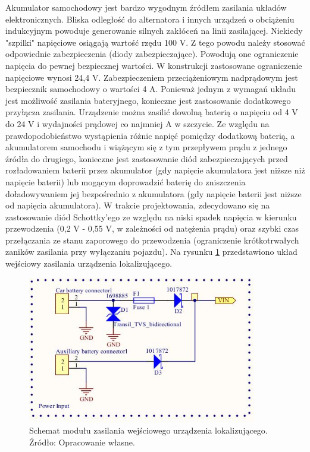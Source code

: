 Akumulator samochodowy jest bardzo wygodnym źródłem zasilania układów elektronicznych. Bliska odległość do alternatora i innych urządzeń o obciążeniu indukcyjnym powoduje generowanie silnych zakłóceń na linii zasilającej. Niekiedy "szpilki" napięciowe osiągają wartość rzędu 100 V. Z tego powodu należy stosować odpowiednie zabezpieczenia (diody zabezpieczające). Powodują one ograniczenie  napięcia do pewnej bezpiecznej wartości. W konstrukcji zastosowane ograniczenie napięciowe wynosi 24,4 V. Zabezpieczeniem przeciążeniowym nadprądowym jest bezpiecznik samochodowy o wartości 4 A. 
Ponieważ jednym z wymagań układu jest możliwość zasilania bateryjnego, konieczne jest zastosowanie dodatkowego przyłącza zasilania. Urządzenie można zasilić dowolną baterią o napięciu od 4 V do 24 V i wydajności prądowej co najmniej  A w szczycie. Ze względu na prawdopodobieństwo wystąpienia różnic napięć pomiędzy dodatkową baterią, a akumulatorem samochodu i wiążącym się z tym przepływem prądu z jednego źródła do drugiego, konieczne jest zastosowanie diód zabezpieczających przed rozładowaniem baterii przez akumulator (gdy napięcie akumulatora jest niższe niż napięcie baterii) lub mogącym doprowadzić baterię do zniszczenia doładowywaniem jej bezpośrednio z akumulatora (gdy napięcie baterii jest niższe od napięcia akumulatora). W trakcie projektowania, zdecydowano się na zastosowanie diód Schottky’ego ze względu na niski spadek napięcia w kierunku przewodzenia (0,2 V - 0,55 V, w zależności od natężenia prądu) oraz szybki czas przełączania ze stanu zaporowego do przewodzenia (ograniczenie krótkotrwałych zaników zasilania przy wyłączaniu pojazdu). Na rysunku \ref{fig:image_mainboard_power_input} przedstawiono układ wejściowy zasilania urządzenia lokalizującego.

\begin{figure}[H]
	\centering
	\includegraphics[width=10cm]{img/schematics/mainboard_power_input.jpg}
	\caption{Schemat modułu zasilania wejściowego urządzenia lokalizującego. \\ Źródło: Opracowanie własne.}
	\label{fig:image_mainboard_power_input}
\end{figure}

